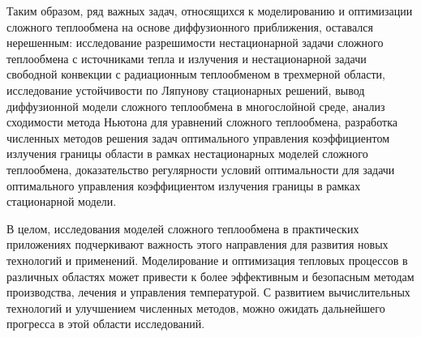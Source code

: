     Таким образом, ряд важных задач, относящихся к моделированию и
    оптимизации сложного теплообмена на основе
    диффузионного приближения, оставался нерешенным: исследование
    разрешимости нестационарной задачи сложного
    теплообмена с источниками тепла и излучения и нестационарной задачи
    свободной конвекции с радиационным теплообменом в трехмерной
    области, исследование устойчивости по Ляпунову стационарных решений,
    вывод диффузионной модели сложного теплообмена в многослойной среде,
    анализ сходимости метода Ньютона
    для уравнений сложного теплообмена, разработка численных
    методов решения задач оптимального управления
    коэффициентом излучения границы области в рамках нестационарных моделей
    сложного теплообмена, доказательство регулярности
    условий оптимальности для задачи оптимального управления коэффициентом
    излучения границы в рамках стационарной модели.

    В целом, исследования моделей сложного теплообмена в практических приложениях
    подчеркивают важность этого направления для развития новых технологий и применений.
    Моделирование и оптимизация тепловых процессов в различных областях может привести
    к более эффективным и безопасным методам производства, лечения и управления температурой.
    С развитием вычислительных технологий и улучшением численных методов, можно ожидать
    дальнейшего прогресса в этой области исследований.


